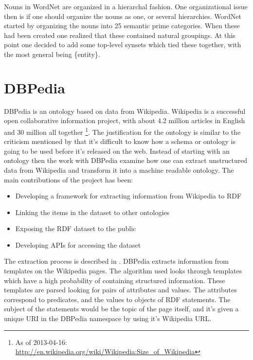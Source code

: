 
Nouns in WordNet are organized in a hierarchal fashion.
One organizational issue then is if one should organize the nouns as one, or several hierarchies.
WordNet started by organizing the nouns into 25 semantic prime categories.
When these had been created one realized that these contained natural groupings.
At this point one decided to add some top-level synsets which tied these together,
with the most general being \{entity\}\citep{Miller1990a}.

\section{DBPedia}
DBPedia is an ontology based on data from Wikipedia.
Wikipedia is a successful open collaborative information project,
with about 4.2 million articles in English and 30 million all together
\footnote{As of 2013-04-16: \url{http://en.wikipedia.org/wiki/Wikipedia:Size_of_Wikipedia}}.
The justification for the ontology is similar to the criticism mentioned by \citet{Shirky2007}
that it's difficult to know how a schema or ontology is going to be used before it's released on the web.
Instead of starting with an ontology then the work with DBPedia examine how one can extract unstructured data
from Wikipedia and transform it into a machine readable ontology.
The main contributions of the project has been\citep{Auer2007}:

\begin{itemize}
	\item Developing a framework for extracting information from Wikipedia to RDF
	\item Linking the items in the dataset to other ontologies
	\item Exposing the RDF dataset to the public
	\item Developing APIs for accessing the dataset
\end{itemize}

The extraction process is described in \citet{Auer2007a}.
DBPedia extracts information from templates on the Wikipedia pages.
The algorithm used looks through templates which have a high probability of containing structured information.
These templates are parsed looking for pairs of attributes and values.
The attributes correspond to predicates, and the values to objects of RDF statements.
The subject of the statements would be the topic of the page itself,
and it's given a unique URI in the DBPedia namespace by using it's Wikipedia URL.

